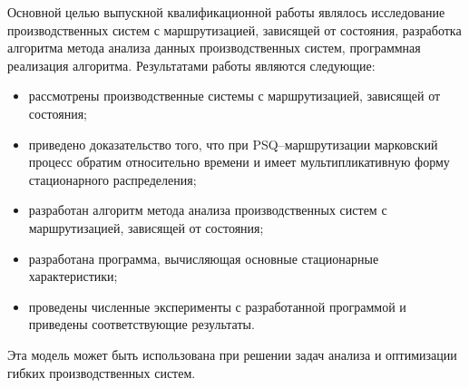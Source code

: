 \conclusion
Основной целью выпускной квалификационной работы являлось исследование производственных систем с маршрутизацией, зависящей от состояния, разработка алгоритма метода анализа данных производственных систем, программная реализация алгоритма. Результатами работы являются следующие:

\begin{itemize}
\item рассмотрены производственные системы с маршрутизацией, зависящей от состояния;
\item приведено доказательство того, что при PSQ--маршрутизации марковский процесс обратим относительно времени и имеет мультипликативную форму стационарного распределения;
\item разработан алгоритм метода анализа производственных систем с маршрутизацией, зависящей от состояния;
\item разработана программа, вычисляющая основные стационарные характеристики;
\item проведены численные эксперименты с разработанной программой и приведены соответствующие результаты.
\end{itemize}

Эта модель может быть использована при решении задач анализа и оптимизации гибких производственных систем.

